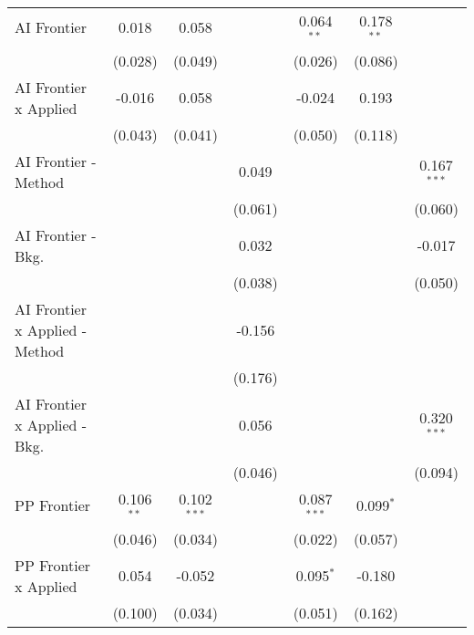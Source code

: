 \begin{tabular}{lcccccc}
   AI Frontier                    & 0.018         & 0.058         &               & 0.064$^{**}$  & 0.178$^{**}$ &   \\   
                                  & (0.028)       & (0.049)       &               & (0.026)       & (0.086)      &   \\   
   AI Frontier x Applied          & -0.016        & 0.058         &               & -0.024        & 0.193        &   \\   
                                  & (0.043)       & (0.041)       &               & (0.050)       & (0.118)      &   \\   
   AI Frontier - Method           &               &               & 0.049         &               &              & 0.167$^{***}$\\   
                                  &               &               & (0.061)       &               &              & (0.060)\\   
   AI Frontier - Bkg.             &               &               & 0.032         &               &              & -0.017\\   
                                  &               &               & (0.038)       &               &              & (0.050)\\   
   AI Frontier x Applied - Method &               &               & -0.156        &               &              &   \\   
                                  &               &               & (0.176)       &               &              &   \\   
   AI Frontier x Applied - Bkg.   &               &               & 0.056         &               &              & 0.320$^{***}$\\   
                                  &               &               & (0.046)       &               &              & (0.094)\\   
   PP Frontier                    & 0.106$^{**}$ & 0.102$^{***}$ &               & 0.087$^{***}$ & 0.099$^{*}$  &   \\   
                                  & (0.046)       & (0.034)       &               & (0.022)       & (0.057)      &   \\   
   PP Frontier x Applied          & 0.054         & -0.052        &               & 0.095$^{*}$   & -0.180       &   \\   
                                  & (0.100)       & (0.034)       &               & (0.051)       & (0.162)      &   \\   

\end{tabular}
